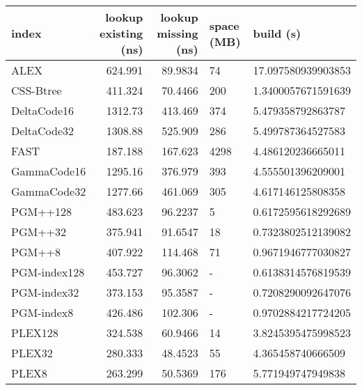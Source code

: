 \begin{tabular}{lrrll}
\hline
 index             &   lookup existing (ns) &   lookup missing (ns) & space (MB)   & build (s)             \\
\hline
 ALEX              &                624.991 &               89.9834 & 74           & 17.097580939903853    \\
 CSS-Btree         &                411.324 &               70.4466 & 200          & 1.3400057671591639    \\
 DeltaCode16       &               1312.73  &              413.469  & 374          & 5.479358792863787     \\
 DeltaCode32       &               1308.88  &              525.909  & 286          & 5.499787364527583     \\
 FAST              &                187.188 &              167.623  & 4298         & 4.486120236665011     \\
 GammaCode16       &               1295.16  &              376.979  & 393          & 4.555501396209001     \\
 GammaCode32       &               1277.66  &              461.069  & 305          & 4.617146125808358     \\
 PGM++128          &                483.623 &               96.2237 & 5            & 0.6172595618292689    \\
 PGM++32           &                375.941 &               91.6547 & 18           & 0.7323802512139082    \\
 PGM++8            &                407.922 &              114.468  & 71           & 0.9671946777030827    \\
 PGM-index128      &                453.727 &               96.3062 & -            & 0.6138314576819539    \\
 PGM-index32       &                373.153 &               95.3587 & -            & 0.7208290092647076    \\
 PGM-index8        &                426.486 &              102.306  & -            & 0.9702884217724205    \\
 PLEX128           &                324.538 &               60.9466 & 14           & 3.8245395475998523    \\
 PLEX32            &                280.333 &               48.4523 & 55           & 4.365458740666509     \\
 PLEX8             &                263.299 &               50.5369 & 176          & 5.771949747949838     \\

\end{tabular}
